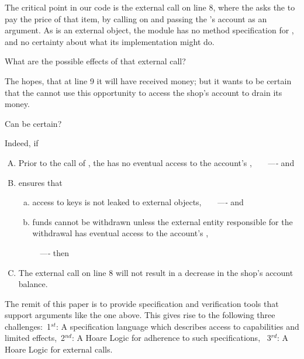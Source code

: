\vspace{.1in}

The critical point in our code is the external call on line 8,   {where the  asks the  to pay the price of that item,
by calling   on  and passing the 's account as an argument.
As  is an external object, the module \Mshop has no method specification for , and no 
certainty about what its implementation %
might do. 
}

{What are the possible effects of that external call?}
{The  hopes, %
 that at line 9  it  will have received money; but 
it wants to be certain  that the  cannot use this opportunity to access the 
shop's account to drain its money.

Can   be certain?} Indeed, if

\vspace{.05cm}
\begin{enumerate}[(A)]
\item   Prior to the call of  , the   has no eventual access to the account's \password, \ \ \ \emph{----} and
\item  \Mshop ensures that 
\begin{enumerate}[(a)]
\item access to keys is not leaked to external objects, \ \ \ \emph{----} and
\item   funds cannot be withdrawn unless the external entity responsible for the withdrawal has eventual access to the account's \password,
\end{enumerate}
\ \  \ \ \ \emph{----} then
\item  The external  call on line 8 will not result  in a decrease in the shop's account balance.
\end{enumerate}



\noindent
The remit of this paper is to provide specification and verification tools that support arguments like the one above.
This gives rise to the following three challenges:\  1$^{st}$:  A specification language which describes access to capabilities and limited effects,\ 
2$^{nd}$: A  Hoare Logic for adherence to such specifications,  \ 3$^{rd}$:    A  Hoare Logic for external calls.

